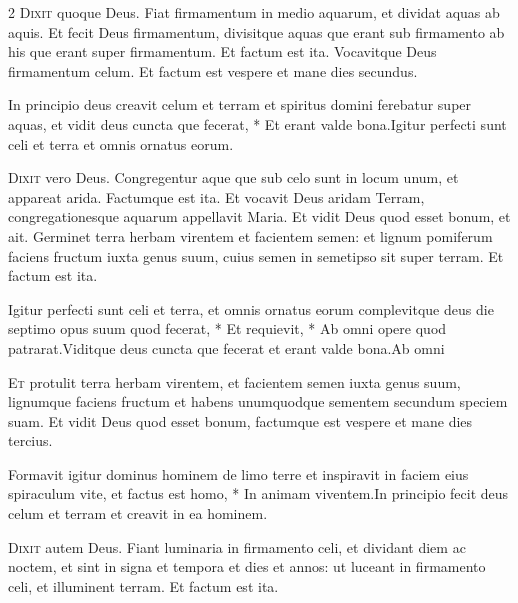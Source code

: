 \begin{multicols*}{2}
\lettrine[lines=2]{\zallmancaps \color{Blue} D}{ixit} quoque Deus. Fiat firmamentum in medio aquarum, et dividat aquas ab aquis. Et fecit Deus firmamentum, divisitque aquas que erant sub firmamento ab his que erant super firmamentum. Et factum est ita. Vocavitque Deus firmamentum celum. Et factum est vespere et mane dies secundus.
\begin{responsory}
{In principio deus creavit celum et terram et spiritus domini ferebatur super aquas, et vidit deus cuncta que fecerat, * Et erant valde bona.}{Igitur perfecti sunt celi et terra et omnis ornatus eorum.}
\end{responsory}%
\lettrine[lines=2]{\zallmancaps \color{Red} D}{ixit} vero Deus. Congregentur aque que sub celo sunt in locum unum, et appareat arida. Factumque est ita. Et vocavit Deus aridam Terram, congregationesque aquarum appellavit Maria. Et vidit Deus quod esset bonum, et ait. Germinet terra herbam virentem et facientem semen: et lignum pomiferum faciens fructum iuxta genus suum, cuius semen in semetipso sit super terram. Et factum est ita.
\begin{responsory-final}
{Igitur perfecti sunt celi et terra, et omnis ornatus eorum complevitque deus die septimo opus suum quod fecerat, * Et requievit, * Ab omni opere quod patrarat.}{Viditque deus cuncta que fecerat et erant valde bona.}{Ab omni}
\end{responsory-final}%
\lettrine[lines=2]{\zallmancaps \color{Blue} E}{t} protulit terra herbam virentem, et facientem semen iuxta genus suum, lignumque faciens fructum et habens unumquodque sementem secundum speciem suam. Et vidit Deus quod esset bonum, factumque est vespere et mane dies tercius.
\begin{responsory}
{Formavit igitur dominus hominem de limo terre et inspiravit in faciem eius spiraculum vite, et factus est homo, * In animam viventem.}{In principio fecit deus celum et terram et creavit in ea hominem.}
\end{responsory}%
\lettrine[lines=2]{\zallmancaps \color{Red} D}{ixit} autem Deus. Fiant luminaria in firmamento celi, et dividant diem ac noctem, et sint in signa et tempora et dies et annos: ut luceant in firmamento celi, et illuminent terram. Et factum est ita.

\end{multicols*}
